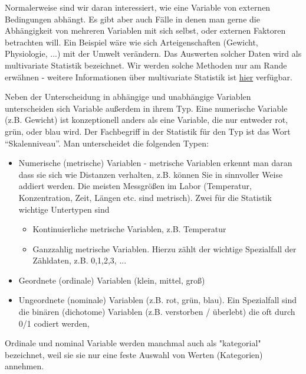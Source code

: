 \documentclass[a4paper,twoside]{tufte-book}\usepackage[]{graphicx}\usepackage[]{color}
\begin{document}
Normalerweise  sind wir daran interessiert, wie eine Variable von externen Bedingungen abhängt. Es gibt aber auch Fälle in denen man gerne die Abhängigkeit von mehreren Variablen mit sich selbst, oder externen Faktoren betrachten will. Ein Beispiel wäre wie sich Arteigenschaften (Gewicht, Physiologie, ...) mit der Umwelt verändern. Das Auswerten solcher Daten wird als multivariate Statistik bezeichnet. Wir werden solche Methoden nur am Rande erwähnen - weitere Informationen über multivariate Statistik ist \href{http://biometry.github.io/APES/Stats/stats50-MultivariateStatistics.html}{hier} verfügbar.

Neben der Unterscheidung in abhängige und unabhängige Variablen unterscheiden sich Variable außerdem in ihrem Typ. Eine numerische Variable (z.B. Gewicht) ist konzeptionell anders als eine Variable, die nur entweder rot, grün, oder blau wird. Der Fachbegriff in der Statistik für den Typ ist das Wort "`Skalenniveau"'. Man unterscheidet die folgenden Typen:
	
	\begin{itemize}
	  \item Numerische (metrische) Variablen - metrische Variablen erkennt man daran dass sie sich wie Distanzen verhalten, z.B. können Sie in sinnvoller Weise addiert werden. Die meisten Messgrößen im Labor (Temperatur, Konzentration, Zeit, Längen etc. sind metrisch). Zwei für die Statistik wichtige Untertypen sind
		\begin{itemize}
  		\item Kontinuierliche metrische Variablen, z.B. Temperatur
  		\item Ganzzahlig metrische Variablen. Hierzu zählt der wichtige Spezialfall der Zähldaten, z.B. 0,1,2,3, ...
		\end{itemize}	  
		\item Geordnete (ordinale) Variablen (klein, mittel, groß)
		\item Ungeordnete (nominale) Variablen (z.B. rot, grün, blau). Ein Spezialfall sind die binären (dichotome) Variablen (z.B. verstorben / überlebt) die oft durch 0/1 codiert werden,
	\end{itemize}
	
	Ordinale und nominal Variable werden manchmal auch als "kategorial" bezeichnet, weil sie sie nur eine feste Auswahl von Werten (Kategorien) annehmen. 
	
\end{document}
